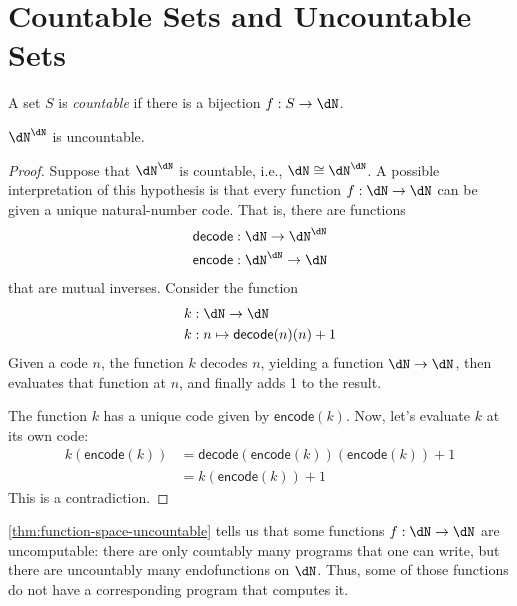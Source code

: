 \documentclass{amsart}
\begin{document}
\section{Countable Sets and Uncountable Sets}
\label{sec:countable-sets-and-uncountable-sets}

\begin{defn}
  A set $S$ is \emph{countable} if there is a bijection $f : S \to \dN$.
\end{defn}

\begin{thm}\label{thm:function-space-uncountable}
  $\dN^{\dN}$ is uncountable.
\end{thm}
\begin{proof}
  Suppose that $\dN^{\dN}$ is countable, i.e., $\dN \iso \dN^{\dN}$.
  A possible interpretation of this hypothesis is that every function $f : \dN \to \dN$ can be given a unique natural-number code.
  That is, there are functions
  \begin{align}
    \mathsf{decode} &: \dN \to \dN^{\dN}\\
    \mathsf{encode} &: \dN^{\dN} \to \dN
  \end{align}
  that are mutual inverses.
  Consider the function
  \begin{align}
    k &: \dN \to \dN\\
    k &: n \mapsto \mathsf{decode}(n)(n) + 1
  \end{align}
  Given a code $n$, the function $k$ decodes $n$, yielding a function $\dN \to \dN$, then evaluates that function at $n$, and finally adds 1 to the result.

  The function $k$ has a unique code given by $\mathsf{encode}(k)$.
  Now, let's evaluate $k$ at its own code:
  \begin{align}
    k(\mathsf{encode}(k)) &= \mathsf{decode}(\mathsf{encode}(k))(\mathsf{encode}(k)) + 1\\
                          &= k(\mathsf{encode}(k)) + 1
  \end{align}
  This is a contradiction.
\end{proof}

\cref{thm:function-space-uncountable} tells us that some functions $f : \dN \to \dN$ are uncomputable: there are only countably many programs that one can write, but there are uncountably many endofunctions on $\dN$. Thus, some of those functions do not have a corresponding program that computes it.
\end{document}

